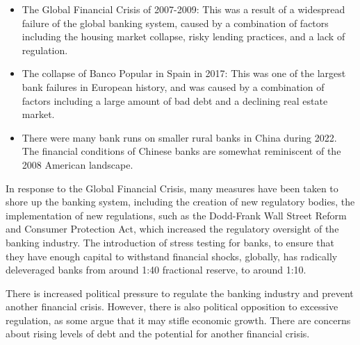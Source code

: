 \begin{itemize}
\item The Global Financial Crisis of 2007-2009: This was a result of a widespread failure of the global banking system, caused by a combination of factors including the housing market collapse, risky lending practices, and a lack of regulation.
\item The collapse of Banco Popular in Spain in 2017: This was one of the largest bank failures in European history, and was caused by a combination of factors including a large amount of bad debt and a declining real estate market.
\item There were many bank runs on smaller rural banks in China during 2022. The financial conditions of Chinese banks are somewhat reminiscent of the 2008 American landscape.
\end{itemize}
In response to the Global Financial Crisis, many measures have been taken to shore up the banking system, including the creation of new regulatory bodies, the implementation of new regulations, such as the Dodd-Frank Wall Street Reform and Consumer Protection Act, which increased the regulatory oversight of the banking industry. The introduction of stress testing for banks, to ensure that they have enough capital to withstand financial shocks, globally, has radically deleveraged banks from around 1:40 fractional reserve, to around 1:10.\par 
There is increased political pressure to regulate the banking industry and prevent another financial crisis. However, there is also political opposition to excessive regulation, as some argue that it may stifle economic growth. There are concerns about rising levels of debt and the potential for another financial crisis.\par 
